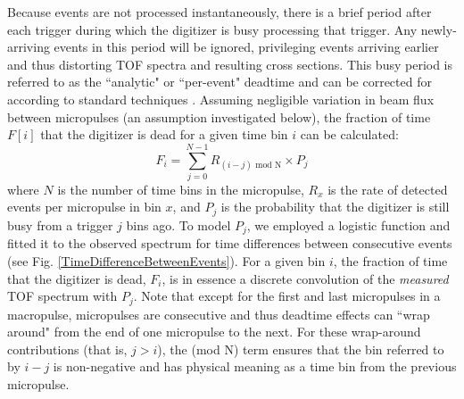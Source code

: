 \documentclass[twocolumn,secnumarabic,amssymb, nobibnotes, aps, prl,
superscriptaddress, nobalancelastpage]{revtex4}
\begin{document}
Because events are not processed instantaneously, there is a brief period
after each trigger during which the digitizer is busy processing that trigger.
Any newly-arriving events in this period will be ignored,
privileging events arriving earlier and thus distorting
TOF spectra and resulting cross sections. This busy period is referred to as the
``analytic" or ``per-event" deadtime and can be corrected for according to standard 
techniques
\cite{Moore1980}. Assuming negligible variation in beam flux between micropulses
(an assumption investigated below), the fraction of time $F[i]$ that the digitizer is dead 
for a given time bin $i$ can be calculated:
\begin{equation}
    F_{i} = \sum^{N-1}_{j=0} R_{(i-j)\text{ mod N}}\times P_{j}
\end{equation}
where $N$ is the number of time bins in the micropulse, $R_{x}$ is the rate of
detected events per micropulse in bin $x$, and $P_{j}$ is the probability that the
digitizer is still busy from a trigger $j$ bins ago. To model $P_{j}$, we
employed a logistic function and fitted it to the observed spectrum for time
differences between consecutive events (see Fig.
\ref{TimeDifferenceBetweenEvents}). For a given bin $i$, the fraction of time that the 
digitizer is dead, $F_{i}$, is in essence a discrete convolution of the
\textit{measured} TOF spectrum with $P_{j}$. Note that except for the first and
last micropulses in a macropulse, micropulses are consecutive and thus deadtime effects can
``wrap around" from the end of one micropulse to the next. For these wrap-around
contributions (that is, $j>i$), the (mod N) term ensures that the bin referred
to by $i-j$ is non-negative and has physical meaning as a time bin from the previous 
micropulse.
\end{document}
